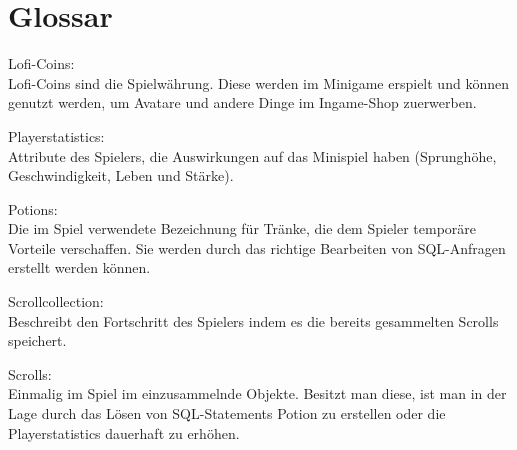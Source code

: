 
\chapter{Glossar}



Lofi-Coins:\\
Lofi-Coins sind die Spielwährung. Diese werden im Minigame erspielt und können genutzt werden, um Avatare und andere Dinge im Ingame-Shop zuerwerben.

Playerstatistics:\\
Attribute des Spielers, die Auswirkungen auf das Minispiel haben (Sprungh\"ohe, Geschwindigkeit, Leben und St\"arke).

Potions: \\
Die im Spiel verwendete Bezeichnung f\"ur Tr\"anke, die dem Spieler tempor\"are Vorteile
verschaffen. Sie werden durch das richtige Bearbeiten von SQL-Anfragen erstellt werden k\"onnen. 

Scrollcollection: \\
Beschreibt den Fortschritt des Spielers indem es die bereits gesammelten Scrolls speichert. 

Scrolls: \\
Einmalig im Spiel im einzusammelnde Objekte. Besitzt man diese, ist man in der Lage durch das L\"osen von SQL-Statements Potion zu erstellen oder die Playerstatistics dauerhaft zu erh\"ohen. 

